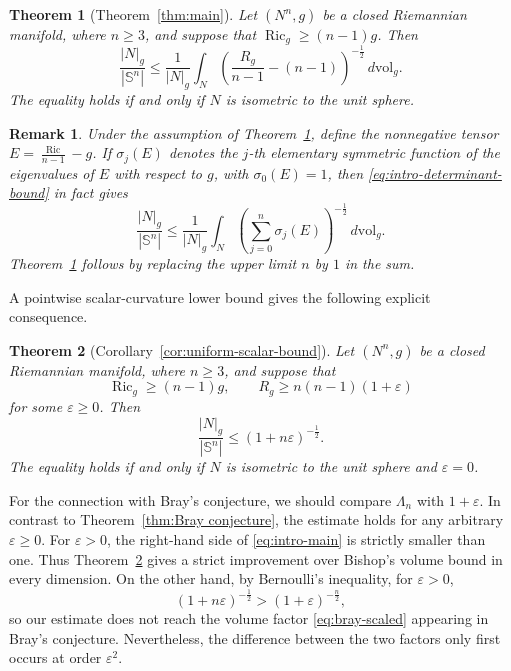 \documentclass[11pt, reqno]{amsart}
\newtheorem{theorem}{Theorem}
\newtheorem{remark}{Remark}
\begin{document}
\begin{theorem}[Theorem~\ref{thm:main}]
\label{thm:intro-main2}
Let $(N^n, g)$ be a closed Riemannian manifold, where $n\ge 3$, and suppose that $\operatorname{Ric}_g\ge (n-1)g$. Then
$$
\frac{|N|_g}{|\mathbb S^n|}
\le
\frac{1}{|N|_g}
\int_N
\left(\frac{R_g}{n-1}-(n-1)\right)^{-\frac12}
\, d\mathrm{vol}_g.
$$
The equality holds if and only if $N$ is isometric to the unit sphere.
\end{theorem}
\begin{remark}
Under the assumption of Theorem~\ref{thm:intro-main2}, define the nonnegative tensor
$E=\frac{\operatorname{Ric}}{n-1}-g$.
If $\sigma_j(E)$ denotes the $j$-th elementary symmetric function of the eigenvalues of $E$ with respect to $g$, with $\sigma_0(E)=1$, then \eqref{eq:intro-determinant-bound} in fact gives
$$
\frac{|N|_g}{|\mathbb S^n|}
\le
\frac{1}{|N|_g}
\int_N
\left(\sum_{j=0}^n\sigma_j(E)\right)^{-\frac12}
\, d\mathrm{vol}_g.
$$
Theorem~\ref{thm:intro-main2} follows by replacing the upper limit $n$ by $1$ in the sum.
\end{remark}
A pointwise scalar-curvature lower bound gives the following explicit consequence.

\begin{theorem}[Corollary~\ref{cor:uniform-scalar-bound}]
\label{thm:intro-main}
Let $(N^n, g)$ be a closed Riemannian manifold, where $n\ge 3$, and suppose that
$$
\operatorname{Ric}_g\ge (n-1)g,
\qquad
R_g\ge n(n-1)(1+\varepsilon)
$$
for some $\varepsilon\ge 0$. Then
\begin{equation}\label{eq:intro-main}
\frac{|N|_g}{|\mathbb S^n|}
\le
(1+n\varepsilon)^{-\frac12}.
\end{equation}
The equality holds if and only if $N$ is isometric to the unit sphere and $\varepsilon=0$.
\end{theorem}
For the connection with Bray's conjecture, we should compare $\Lambda_n$ with $1+\varepsilon$. In contrast to Theorem~\ref{thm:Bray conjecture}, the estimate holds for any arbitrary $\varepsilon\ge 0$.
For $\varepsilon>0$, the right-hand side of \eqref{eq:intro-main} is strictly smaller than one. Thus Theorem~\ref{thm:intro-main} gives a strict improvement over Bishop's volume bound in every dimension. On the other hand, by Bernoulli's inequality, for $\varepsilon>0$,
$$
(1+n\varepsilon)^{-\frac12} > (1+\varepsilon)^{-\frac n2},
$$
so our estimate does not reach the volume factor \eqref{eq:bray-scaled} appearing in Bray's conjecture. Nevertheless, the difference between the two factors only first occurs at order $\varepsilon^2$.
\end{document}

